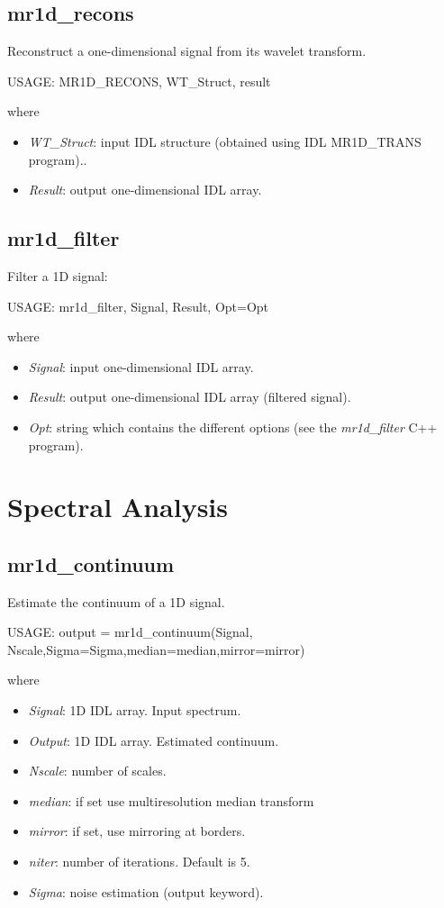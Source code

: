 \subsection{mr1d\_recons}
Reconstruct a one-dimensional signal from its wavelet transform.   
{\bf
\begin{center}
     USAGE:  MR1D\_RECONS, WT\_Struct, result
\end{center}}
where 
\begin{itemize}
\item {\em WT\_Struct}: input  IDL structure (obtained using IDL MR1D\_TRANS program)..
\item {\em Result}: output one-dimensional IDL array.
\end{itemize}

\subsection{mr1d\_filter}
Filter a 1D signal:
\begin{center}
     USAGE: mr1d\_filter, Signal, Result, Opt=Opt
\end{center}
where 
\begin{itemize}
\item {\em Signal}: input  one-dimensional IDL array.
\item {\em Result}: output one-dimensional IDL array (filtered signal).
\item {\em Opt}:  string which contains the different options 
(see the {\em mr1d\_filter} C++  program).
\end{itemize}

\section{Spectral Analysis}

\subsection{mr1d\_continuum}
Estimate the continuum of a 1D signal.
{\bf
\begin{center}
     USAGE: output = mr1d\_continuum(Signal, Nscale,Sigma=Sigma,median=median,mirror=mirror)
\end{center}}
where 
\begin{itemize}
\item {\em Signal}: 1D IDL array. Input spectrum.
\item {\em Output}: 1D IDL array. Estimated continuum.
\item {\em Nscale}: number of scales.
\item {\em median}: if set  use multiresolution median transform
\item {\em mirror}: if set, use mirroring at borders.
\item {\em niter}: number of iterations. Default is 5.
\item {\em Sigma}: noise estimation (output keyword).
\end{itemize}

